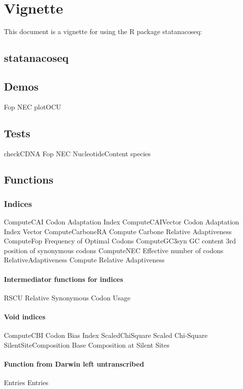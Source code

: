 \chapter{Vignette}
This document is a vignette for using the R package statanacoseq:


\section{statanacoseq}


\section{Demos}
Fop
NEC
plotOCU


\section{Tests}
checkCDNA
Fop
NEC
NucleotideContent
species

\section{Functions}

\subsection{Indices}
ComputeCAI	Codon Adaptation Index
ComputeCAIVector	Codon Adaptation Index Vector
ComputeCarboneRA	Compute Carbone Relative Adaptiveness
ComputeFop	Frequency of Optimal Codons
ComputeGC3syn	GC content 3rd position of synonymous codons		%
ComputeNEC	Effective number of codons							%
RelativeAdaptiveness	Compute Relative Adaptiveness				%

\subsubsection{Intermediator functions for indices}
RSCU	Relative Synonymous Codon Usage								%

\subsubsection{Void indices}
ComputeCBI	Codon Bias Index
ScaledChiSquare	Scaled Chi-Square
SilentSiteComposition	Base Composition at Silent Sites

\subsubsection{Function from Darwin left untranscribed}
Entries	Entries

